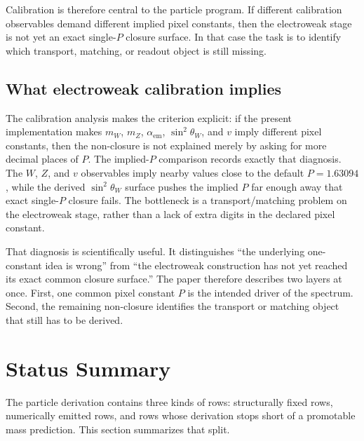 \documentclass[11pt]{article}
\begin{document}
Calibration is therefore central to the particle program. If different calibration observables
demand different implied pixel constants, then the electroweak stage is not yet an exact
single-\(P\) closure surface. In that case the task is
to identify which transport, matching, or readout object is still missing.

\subsection{What electroweak calibration implies}

The calibration analysis makes the criterion explicit: if the present implementation makes
\(m_W\), \(m_Z\), \(\alpha_{\mathrm{em}}\), \(\sin^2\theta_W\), and \(v\) imply different pixel
constants, then the non-closure is not explained merely by asking for more decimal places of
\(P\). The implied-\(P\) comparison records exactly that
diagnosis. The \(W\), \(Z\), and \(v\) observables imply nearby values close to the default
\(P=1.63094\), while the derived \(\sin^2\theta_W\) surface pushes the implied \(P\) far enough
away that exact single-\(P\) closure fails. The bottleneck is a transport/matching problem on the
electroweak stage, rather than a lack of extra digits
in the declared pixel constant.

That diagnosis is scientifically useful. It distinguishes ``the underlying one-constant idea is
wrong'' from ``the electroweak construction has not yet reached its exact common closure
surface.'' The paper therefore describes two layers at once. First, one common pixel
constant \(P\) is the intended driver of the spectrum. Second, the remaining non-closure identifies the transport or
matching object that still has to be derived.

\section{Status Summary}

The particle derivation contains three kinds of rows: structurally fixed rows, numerically emitted
rows, and rows whose derivation stops short of a promotable mass prediction. This section
summarizes that split.
\end{document}
